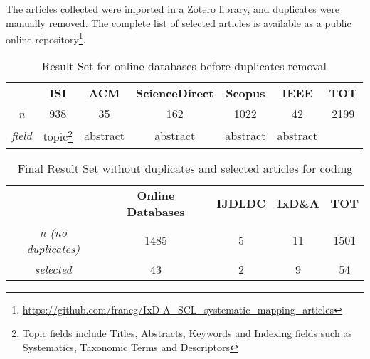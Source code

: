 The articles collected were imported in a Zotero library, and duplicates were manually removed.
The complete list of selected articles is available as a public online repository\footnote{\url{https://github.com/francg/IxD-A_SCL_systematic_mapping_articles}}.

\begin{savenotes}
\begin{table}[ht]
\setlength{\tabcolsep}{8pt}
\centering
\caption{Result Set for online databases before duplicates removal}
\label{table:result_1}
\begin{tabular}{cccccc|c}
 & \cellcolor[HTML]{EFEFEF}\textbf{ISI} & \cellcolor[HTML]{EFEFEF}\textbf{ACM} & \cellcolor[HTML]{EFEFEF}\textbf{ScienceDirect} & \cellcolor[HTML]{EFEFEF}\textbf{Scopus} & \cellcolor[HTML]{EFEFEF}\textbf{IEEE} & \textbf{TOT} \\
\textit{n} & 938 & 35 & 162 & 1022 & 42 & 2199 \\
\textit{field} & topic\footnote{Topic fields include Titles, Abstracts, Keywords and Indexing fields such as Systematics, Taxonomic Terms and Descriptors} & abstract & abstract & abstract & abstract & 
\end{tabular}
\end{table}
\end{savenotes}

\begin{table}[ht]
\setlength{\tabcolsep}{8pt}
\centering
\caption{Final Result Set without duplicates and selected articles for coding}
\label{table:result_2}
\begin{tabular}{cccc|c}
 & \cellcolor[HTML]{EFEFEF}\textbf{Online Databases} & \cellcolor[HTML]{EFEFEF}\textbf{IJDLDC} & \cellcolor[HTML]{EFEFEF}\textbf{IxD\&A} & \textbf{TOT} \\
\textit{n (no duplicates)} & 1485 & 5 & 11 & 1501 \\
\textit{selected} & 43 & 2 & 9 & 54
\end{tabular}
\end{table}